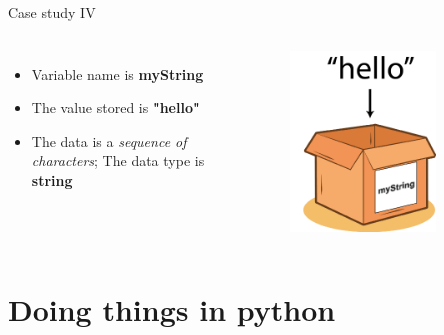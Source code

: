 \documentclass[10pt,xcolor={table,dvipsnames},t]{beamer}
\begin{document}
\begin{frame}{Case study IV}
  \begin{columns}
    \begin{itemize}
      \item Variable name is \textbf{myString}
      \item The value stored is \textbf{"hello"}
      \item The data is a \textit{sequence of characters}; The data type is \textbf{string}
    \end{itemize}
    \begin{figure}
      \includegraphics[width=0.8\textwidth]{img/variable-str.png}
    \end{figure}
  \end{columns}
\end{frame}

\section{Doing things in python}
\end{document}
